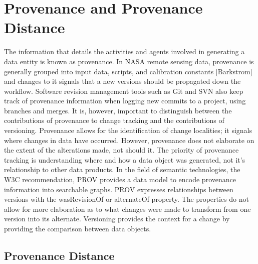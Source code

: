 \section{Provenance and Provenance Distance}

The information that details the activities and agents involved in generating a data entity is known as provenance.
In NASA remote sensing data, provenance is generally grouped into input data, scripts, and calibration constants [Barkstrom] and changes to it signals that a new versions should be propagated down the workflow.
Software revision management tools such as Git and SVN also keep track of provenance information when logging new commits to a project, using branches and merges.
It is, however, important to distinguish between the contributions of provenance to change tracking and the contributions of versioning.
Provenance allows for the identification of change localities; it signals where changes in data have occurred.
However, provenance does not elaborate on the extent of the alterations made, not should it.
The priority of provenance tracking is understanding where and how a data object was generated, not it's relationship to other data products.
In the field of semantic technologies, the W3C recommendation, PROV provides a data model to encode provenance information into searchable graphs.
PROV expresses relationships between versions with the wasRevisionOf or alternateOf property.
The properties do not allow for more elaboration as to what changes were made to transform from one version into its alternate.
Versioning provides the context for a change by providing the comparison between data objects.

\subsection{Provenance Distance}

